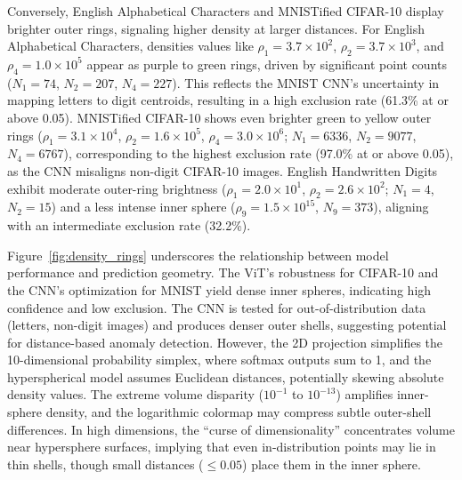 Conversely, English Alphabetical Characters and MNISTified CIFAR-10 display brighter outer rings, signaling higher density at larger distances. For English Alphabetical Characters, densities values like \(\rho_1 = 3.7 \times 10^2\), \(\rho_2 = 3.7 \times 10^3\), and \(\rho_4 = 1.0 \times 10^5\) appear as purple to green rings, driven by significant point counts (\(N_1 = 74\), \(N_2 = 207\), \(N_4 = 227\)). This reflects the MNIST CNN’s uncertainty in mapping letters to digit centroids, resulting in a high exclusion rate (61.3\% at or above 0.05). MNISTified CIFAR-10 shows even brighter green to yellow outer rings (\(\rho_1 = 3.1 \times 10^4\), \(\rho_2 = 1.6 \times 10^5\), \(\rho_4 = 3.0 \times 10^6\); \(N_1 = 6336\), \(N_2 = 9077\), \(N_4 = 6767\)), corresponding to the highest exclusion rate (97.0\% at or above 0.05), as the CNN misaligns non-digit CIFAR-10 images. English Handwritten Digits exhibit moderate outer-ring brightness (\(\rho_1 = 2.0 \times 10^1\), \(\rho_2 = 2.6 \times 10^2\); \(N_1 = 4\), \(N_2 = 15\)) and a less intense inner sphere (\(\rho_9 = 1.5 \times 10^{15}\), \(N_9 = 373\)), aligning with an intermediate exclusion rate (32.2\%).

Figure~\ref{fig:density_rings} underscores the relationship between model performance and prediction geometry. The ViT’s robustness for CIFAR-10 and the CNN’s optimization for MNIST yield dense inner spheres, indicating high confidence and low exclusion. The CNN is tested for out-of-distribution data (letters, non-digit images) and produces denser outer shells, suggesting potential for distance-based anomaly detection. However, the 2D projection simplifies the 10-dimensional probability simplex, where softmax outputs sum to 1, and the hyperspherical model assumes Euclidean distances, potentially skewing absolute density values. The extreme volume disparity (\(10^{-1}\) to \(10^{-13}\)) amplifies inner-sphere density, and the logarithmic colormap may compress subtle outer-shell differences. In high dimensions, the ``curse of dimensionality'' concentrates volume near hypersphere surfaces, implying that even in-distribution points may lie in thin shells, though small distances (\(\leq 0.05\)) place them in the inner sphere.